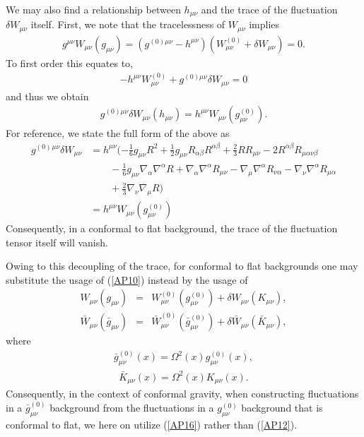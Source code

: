 We may also find a relationship between $h_{\mu\nu}$ and the trace of the fluctuation $\delta W_{\mu\nu}$ itself. First, we note that the tracelessness of $W_{\mu\nu}$ implies
\begin{eqnarray}
g^{\mu\nu}W_{\mu\nu}(g_{\mu\nu}) = \left({ g^{(0)\mu\nu}-h^{\mu\nu}}\right)\left({ W^{(0)}_{\mu\nu}+ \delta W_{\mu\nu}}\right)=0.
\end{eqnarray}
To first order this equates to,
\begin{eqnarray}
-h^{\mu\nu}W^{(0)}_{\mu\nu} + g^{(0)\mu\nu}\delta W_{\mu\nu} = 0
\end{eqnarray}
and thus we obtain
\begin{eqnarray}
g^{(0)\mu\nu}\delta W_{\mu\nu}(h_{\mu\nu}) = h^{\mu\nu}W_{\mu\nu}(g^{(0)}_{\mu\nu}).
\end{eqnarray}
For reference, we state the full form of the above as
\begin{align}
g^{(0)}{}^{\mu\nu}\delta W_{\mu\nu} &= h^{\mu \nu} (- \tfrac{1}{6} g_{\mu \nu} R^2 + \tfrac{1}{2} g_{\mu \nu} R_{\alpha \beta} R^{\alpha \beta} + \tfrac{2}{3} R R_{\mu \nu} - 2 R^{\alpha \beta} R_{\mu \alpha \nu \beta}
\nonumber\\
&\qquad -  \tfrac{1}{6} g_{\mu \nu} \nabla_{\alpha}\nabla^{\alpha}R  +\nabla_{\alpha}\nabla^{\alpha}R_{\mu \nu} -  \nabla_{\mu}\nabla^{\alpha}R_{\nu \alpha} -  \nabla_{\nu}\nabla^{\alpha}R_{\mu \alpha} 
\nonumber\\
&\qquad + \tfrac{2}{3} \nabla_{\nu}\nabla_{\mu}R) \nonumber\\
&=h^{\mu\nu}W_{\mu\nu}(g^{(0)}_{\mu\nu})
\end{align}
Consequently, in a conformal to flat background, the trace of the fluctuation tensor itself will vanish. 

Owing to this decoupling of the trace, for conformal to flat backgrounds one may substitute the usage of (\ref{AP10}) instead by the usage of
%
\begin{eqnarray}
W_{\mu\nu}(g_{\mu\nu})&=& W^{(0)}_{\mu\nu}(g^{(0)}_{\mu\nu})+\delta W_{\mu\nu}(K_{\mu\nu}),
\nonumber\\
\bar{W}_{\mu\nu}(\bar{g}_{\mu\nu})&=&\bar{W}^{(0)}_{\mu\nu}(\bar{g}^{(0)}_{\mu\nu})+\delta\bar{W}_{\mu\nu}(\bar{K}_{\mu\nu}),
\label{AP14}
\end{eqnarray}
%
where
%
\begin{eqnarray}
\bar{g}^{(0)}_{\mu\nu}(x)=\Omega^2(x)g^{(0)}_{\mu\nu}(x),
\label{AP15}
\end{eqnarray}
% 
%
\begin{eqnarray}
\bar{K}_{\mu\nu}(x)=\Omega^2(x)K_{\mu\nu}(x).
\label{AP16}
\end{eqnarray}
% 
Consequently, in the context of conformal gravity, when constructing fluctuations in a $\bar{g}^{(0)}_{\mu\nu}$ background from the fluctuations in a $g^{(0)}_{\mu\nu}$ background that is conformal to flat, we here on utilize (\ref{AP16}) rather than (\ref{AP12}). 

